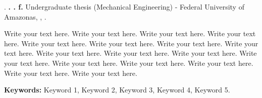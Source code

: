 \singlespacing %

\noindent \CITACAOAUTOR. \textbf{\TITLE. \ANO. \pageref{LastPage}f.} Undergraduate thesis (Mechanical Engineering) - Federal University of Amazonas, \LOCAL, \ANOD.  

  
\vspace{0.5 cm}

\onehalfspacing %
\noindent Write your text here. Write your text here. Write your text here. Write your text here. Write your text here. Write your text here. Write your text here. Write your text here. Write your text here. Write your text here. Write your text here. Write your text here. Write your text here. Write your text here. Write your text here. Write your text here. Write your text here. 

\noindent \textbf{Keywords:} Keyword 1, Keyword 2, Keyword 3, Keyword 4, Keyword 5.

